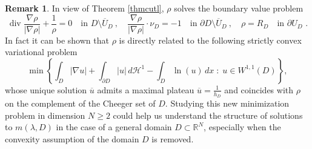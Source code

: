 \documentclass[reqno,11pt]{amsart}
\newtheorem{corollary}[theorem]{Corollary}
\theoremstyle{definition}
\newtheorem{remark}[theorem]{Remark}
\numberwithin{equation}{section}
\def\ov{\overline}
\DeclareMathOperator{\Div}{div}
\newcommand{\HH}{\mathcal{H}}
\newcommand{\RR}{\mathbb{R}}
\def\R{\mathbb{R}}
\newcommand{\QQ}{\mathcal{Q}}
\newcommand{\tinm}[1]{\text{\;#1\;}}
\newcommand{\1}{{{\bf 1}\kern-0,28em\rm l}}
\def\sepa{\; : \;}
\newcommand{\aco}[1]{\left\{#1\right\}}
\newcommand{\pare}[1]{\left(#1\right)}
\def\l{\lambda}
\begin{document}
\begin{remark} \label{newpb} In view of Theorem \ref{thmcutl}, $\rho$ solves the boundary value problem 
$$  \Div \frac{\nabla \rho}{|\nabla\rho|}  + \frac1{\rho}=0 \quad \text{in $D\setminus \ov U_D$}\ , 
\quad  \frac{\nabla \rho}{|\nabla\rho|}\cdot \nu_D =- 1 \quad \text{in $\partial D\setminus \ov U_D$}\ ,\quad \rho=R_D\quad \text{in $\partial U_D $ .}$$
In fact it can be shown that  $\rho$ is directly  related to the following strictly convex variational problem
$$  \min \aco{ \int_D |\nabla u| + \int_{\partial D} |u|\, d\HH^1 - \int_D \ln(u) \, dx \sepa   u\in W^{1,1}(D) } ,$$
whose unique solution $\ov u$ admits a maximal plateau $\ov u= \frac1{h_D}$ and coincides with $\rho$ on the complement of the Cheeger set of $D$.
Studying this new  minimization problem in dimension $N \ge 2$ could help us  understand the structure of solutions  to $m(\l,D)$ in the case of a general domain $D\subset \R^N$, especially when the convexity assumption of the domain $D$ is removed.
\end{remark}


%
%
%
\end{document}

